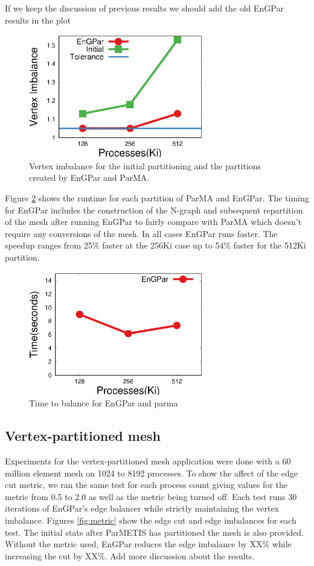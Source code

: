 \documentclass[conference]{IEEEtran}
\begin{document}
{\color{red} If we keep the discussion of previous results we should add the old EnGPar results in the plot}
\begin{figure}[!ht]
  \centering
  \includegraphics[width=3in]{plots/mira_fem_results/vimb_v_cores}
  \caption{Vertex imbalance for the initial partitioning and the partitions created by
    EnGPar and ParMA.}
  \label{fig:fem_vtximb}
\end{figure}

Figure \ref{fig:fem_time} shows the runtime for each partition of ParMA and EnGPar. The
timing for EnGPar includes the construction of the N-graph and subsequent repartition of
the mesh after running EnGPar to fairly compare with ParMA which doesn't require any
conversions of the mesh. In all cases EnGPar runs faster. The speedup ranges from
25\% faster at the 256Ki case up to 54\% faster for the 512Ki partition.

\begin{figure}[!ht]
  \centering
  \includegraphics[width=3in]{plots/mira_fem_results/time_v_cores}
  \caption{Time to balance for EnGPar and parma}
  \label{fig:fem_time}
\end{figure}

\subsection {Vertex-partitioned mesh}
Experiments for the vertex-partitioned mesh application were done with a 60 million
element mesh on 1024 to 8192 processes. To show the affect of the edge cut
metric, we ran the same test for each process count giving values for the metric
from 0.5 to 2.0 as well as the metric being turned off. Each test runs 30 iterations
of EnGPar's edge balancer while strictly maintaining the vertex imbalance. Figures
\ref{fig:metric} show the edge cut and edge imbalances for each
test. The initial stats after ParMETIS has partitioned the mesh is also provided. Without
the metric used, EnGPar reduces the edge imbalance by XX\% while increasing the cut by
XX\%. {\color{red} Add more discussion about the results.}
\end{document}
